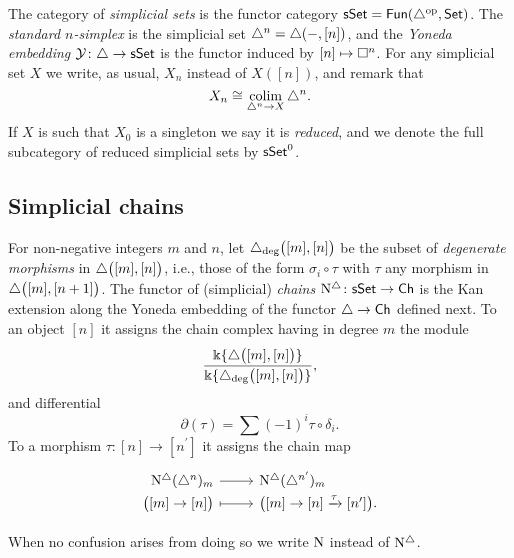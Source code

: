 The category of \textit{simplicial sets} is the functor category $\mathsf{sSet} = \mathsf{Fun}(\triangle^{\mathrm{op}}, \mathsf{Set})$.
The \textit{standard $n$-simplex} is the simplicial set $\triangle^n = \triangle(-, [n])$, and the \textit{Yoneda embedding} $\operatorname{\mathcal{Y}} \colon \triangle \to \mathsf{sSet}$ is the functor induced by $[n] \mapsto \square^n$.
For any simplicial set $X$ we write, as usual, $X_n$ instead of $X([n])$, and remark that
\begin{equation*}
X_n \cong \operatorname*{colim}_{\triangle^n \to X} \triangle^n.
\end{equation*}
If $X$ is such that $X_0$ is a singleton we say it is \textit{reduced}, and we denote the full subcategory of reduced simplicial sets by $\mathsf{sSet}^0$.

\subsection{Simplicial chains} \label{ss:simplicial sets}

For non-negative integers $m$ and $n$, let $\triangle_{\deg} \big( [m], [n] \big)$ be the subset of \textit{degenerate morphisms} in $\triangle \big( [m], [n] \big)$, i.e., those of the form $\sigma_i \circ \tau$ with $\tau$ any morphism in $\triangle \big( [m], [n+1] \big)$.
The functor of (simplicial) \textit{chains} $\operatorname{N^{\triangle}} \colon \mathsf{sSet} \to \mathsf{Ch}$ is the Kan extension along the Yoneda embedding of the functor $\triangle \to \mathsf{Ch}$ defined next.
To an object $[n]$ it assigns the chain complex having in degree $m$ the module
\begin{equation*}
\frac{\Bbbk\{\triangle \big( [m], [n] \big) \}}{\Bbbk\{\triangle_{\deg} \big( [m], [n] \big) \}},
\end{equation*}
and differential
\begin{equation*}
\partial(\tau) = \sum (-1)^i \tau \circ \delta_i.
\end{equation*}
To a morphism $\tau \colon [n] \to [n^\prime]$ it assigns the chain map
\begin{equation*}
\begin{tikzcd}[row sep=-3pt, column sep=normal,
/tikz/column 1/.append style={anchor=base east},
/tikz/column 2/.append style={anchor=base west}]
\schains(\simplex^n)_m \arrow[r] &  \schains(\simplex^{n^\prime})_m \\
\big( [m] \to [n] \big) \arrow[r, mapsto] & \big( [m] \to [n] \xra{\tau} [n^\prime] \big).
\end{tikzcd}
\end{equation*}

When no confusion arises from doing so we write $\operatorname{N}$ instead of $\operatorname{N^{\triangle}}$.

